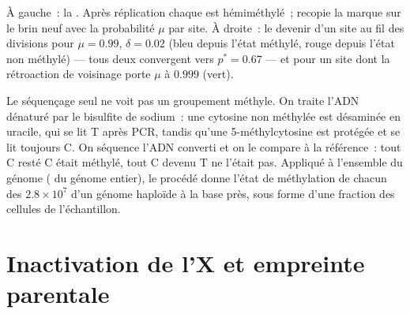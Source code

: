 \begin{omfigure}
{\small À gauche~: la . Après réplication
chaque  est hémiméthylé~;  recopie la marque sur le brin neuf
avec la probabilité $\mu$ par site. À droite~: le devenir d'un site au
fil des divisions pour $\mu = 0.99$, $\delta = 0.02$ (bleu depuis
l'état méthylé, rouge depuis l'état non méthylé) --- tous deux
convergent vers $p^{*} = 0.67$ --- et pour un site dont la rétroaction
de voisinage porte $\mu$ à $0.999$ (vert).}
\end{omfigure}

\begin{method}\label{met:b3:chromatin-epigenetics:bisulfite}
Le séquençage seul ne voit pas un groupement méthyle. On traite l'ADN
dénaturé par le bisulfite de sodium~: une cytosine non méthylée est
désaminée en uracile, qui se lit T après PCR, tandis qu'une
5-méthylcytosine est protégée et se lit toujours C. On séquence l'ADN
converti et on le compare à la référence~: tout C resté C était
méthylé, tout C devenu T ne l'était pas. Appliqué à l'ensemble du
génome ( du génome entier), le procédé donne
l'état de méthylation de chacun des $2.8\times 10^{7}$  d'un génome
haploïde à la base près, sous forme d'une fraction des cellules de
l'échantillon.
\end{method}

\section{Inactivation de l'X et empreinte parentale}


